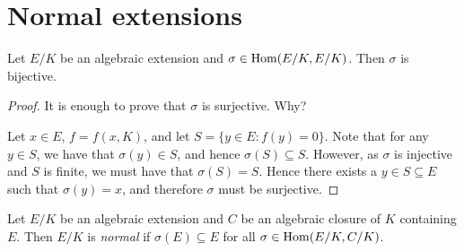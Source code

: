 

\section{Normal extensions}
\lecture\label{section:normal_extensions}
\begin{proposition}
    Let $E/K$ be an algebraic extension and $\sigma\in\operatorname{Hom}(E/K,E/K)$. 
    Then $\sigma$ is bijective. 
\end{proposition}

\begin{proof}
    It is enough to prove that $\sigma$ is surjective. Why? 
    
    Let $x\in E$, $f=f(x,K)$, and let $S=\{y \in E : f(y)=0\}$. Note that for any $y \in S$, we have that $\sigma(y) \in S$, and hence $\sigma(S) \subseteq S$. However, as $\sigma$ is injective and $S$ is finite, we must have that $\sigma(S)=S$. Hence there exists a $y \in S \subseteq E$ such that $\sigma(y)=x$, and therefore $\sigma$ must be surjective.
    
\end{proof}



\begin{definition}
    Let $E/K$ be an algebraic extension and $C$ be an algebraic closure of $K$ containing $E$. Then $E/K$ is \emph{normal} if 
    $\sigma(E)\subseteq E$ for all $\sigma\in\operatorname{Hom}(E/K,C/K)$. 
\end{definition}

